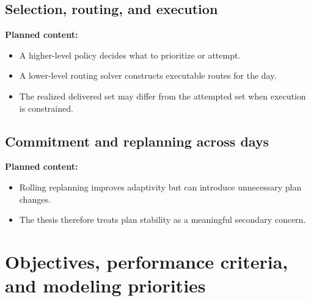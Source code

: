 \subsection{Selection, routing, and execution}
\label{subsec:chapter03_selection_routing_execution}

%

\noindent\textbf{Planned content:}
\begin{itemize}
    \item A higher-level policy decides what to prioritize or attempt.
    \item A lower-level routing solver constructs executable routes for the day.
    \item The realized delivered set may differ from the attempted set when execution is constrained.
\end{itemize}

\subsection{Commitment and replanning across days}
\label{subsec:chapter03_commitment_and_replanning}

%

\noindent\textbf{Planned content:}
\begin{itemize}
    \item Rolling replanning improves adaptivity but can introduce unnecessary plan changes.
    \item The thesis therefore treats plan stability as a meaningful secondary concern.
\end{itemize}

\section{Objectives, performance criteria, and modeling priorities}
\label{sec:chapter03_objectives_and_metrics}

%


